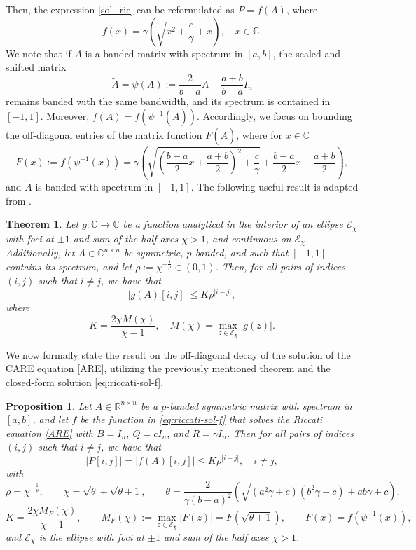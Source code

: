 \documentclass{article}
\newtheorem{theorem}[lemma]{Theorem}
\newtheorem{prop}{Proposition}[section]
\begin{document}
Then, the expression \eqref{sol_ric} can be reformulated  as $P=f(A)$, where
\begin{equation}\label{eq:riccati-sol-f}
f(x) = \gamma \left(\sqrt{x^2+\frac{c}{\gamma} } + x\right), \quad x \in \mathbb{C}.
\end{equation}
We note that if $A$ is a banded matrix with spectrum in $[a,b]$, the scaled and shifted matrix
$$
\widetilde{A} =  \psi(A) := \frac{2}{b-a} A - \frac{a+b}{b-a} I_n
$$
remains banded with the same bandwidth, and its spectrum is contained in $[-1,1]$. Moreover,  $f(A)= f(\psi^{-1}(\widetilde A))$. Accordingly, we focus on bounding the off-diagonal entries of the matrix function $F(\widetilde A)$, where for $x \in \mathbb{C}$
\begin{equation}
    F(x) := f(\psi^{-1}(x))= \gamma \left(\sqrt{\left( \frac{b-a}{2}x +\frac{a+b}{2}\right)^2+\frac{c}{\gamma} } + \frac{b-a}{2}x +\frac{a+b}{2}\right), 
    \label{f_psi}
\end{equation}
and $\widetilde A$ is banded with spectrum in $[-1,1]$.
The following useful result is adapted from \cite[Theorem 2.2]{benzi1999bounds}.

\begin{theorem}
\label{thm_benzi}
Let $g: \mathbb{C} \rightarrow \mathbb{C}$ be a function analytical in the interior of an ellipse $\mathcal{E}_\chi$ with foci at $\pm 1$ and sum of the half axes $\chi>1$, and continuous on $\mathcal{E}_\chi$. Additionally, let $A\in\mathbb C^{n\times n}$ be symmetric, $p$-banded, and such that $[-1,1]$ contains its spectrum, and let $\rho := \chi^{-\frac{1}{p}}\in(0, 1)$. Then, for all pairs of indices $(i,j)$  such that $i \neq j$, we have that 
$$
|g(A)[i,j]| \le K \rho ^{|i-j|},
$$
where
$$
K = \frac{2 \chi M(\chi)}{\chi-1}, \quad M(\chi) = \max_{z \in \mathcal{E}_\chi} |g(z)|.
$$
\end{theorem}

We now formally state the result on the off-diagonal decay of the solution of the CARE equation \eqref{ARE}, utilizing the previously mentioned theorem and the closed-form solution \eqref{eq:riccati-sol-f}.

\begin{prop} \label{prop.ExistenceDecayCont}
    Let $A \in \mathbb{R}^{n \times n}$ be a $p$-banded symmetric matrix with spectrum in $[a, b]$, and let $f$ be the function in \eqref{eq:riccati-sol-f} that solves the Riccati equation \eqref{ARE} with $B=I_n$, $Q=cI_n$, and $R=\gamma I_n$. Then for all pairs of indices $(i,j)$  such that $i \neq j$, we have that
\begin{equation}
|P[i,j]| = |f(A)[i,j]| \le K \rho^{|i-j|}, \quad i \neq j,
\label{esti_square_root}
\end{equation}
with 
$$
\rho = \chi^{-\frac{1}{p}}, \qquad  \chi = \sqrt{\theta} + \sqrt{\theta+1}, \qquad \theta=\frac{2}{\gamma (b-a)^2}\left(\sqrt{(a^2 \gamma+c)(b^2 \gamma +c)}+ab \gamma +c\right),$$
$$K  = \frac{2 \chi M_F(\chi)}{\chi-1} , \qquad
M_F(\chi) := \max_{z \in \mathcal{E}_{\chi}} |F(z)| = F\left(\sqrt{\theta+1}\right),\qquad F(x)= f(\psi^{-1}(x)),
$$
and $\mathcal{E}_\chi$ is the ellipse with foci at $\pm 1$ and sum of the half axes $\chi>1$.
\label{prop_decay_CARE}
\end{prop}
\end{document}
